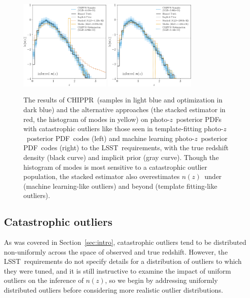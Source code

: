 \documentclass[iop]{emulateapj}
\newcommand{\Sect}[1]{Section~\ref{#1}}
\newcommand{\project}[1]{\textsc{#1}}
\newcommand{\lsst}{\project{LSST}}
\newcommand{\Chippr}{\project{CHIPPR}}
\newcommand{\pz}{photo-$z$}
\newcommand{\pzpdf}{\pz\ posterior PDF}
\newcommand{\nz}{$n(z)$}
\begin{document}
\begin{figure}
	\begin{center}
		\includegraphics[width=0.4\textwidth]{results_outlier_template.png}
		\includegraphics[width=0.4\textwidth]{results_outlier_training.png}
		\caption{
			The results of \Chippr\ (samples in light blue and optimization in dark blue) and the alternative approaches (the stacked estimator in red, the histogram of modes in yellow) on \pzpdf s with catastrophic outliers like those seen in template-fitting \pzpdf\ codes (left) and machine learning \pzpdf\ codes (right) to the \lsst\ requirements, with the true redshift density (black curve) and implicit prior (gray curve).
			Though the histogram of modes is most sensitive to a catastrophic outlier population, the stacked estimator also overestimates \nz\ under (machine learning-like outliers) and beyond (template fitting-like outliers).
		}
		\label{fig:nonuniform-outliers-results}
	\end{center}
\end{figure}

\subsection{Catastrophic outliers}
\label{sec:outliers}

As was covered in \Sect{sec:intro}, catastrophic outliers tend to be distributed non-uniformly across the space of observed and true redshift.
However, the \lsst\ requirements do not specify details for a distribution of outliers to which they were tuned, and it is still instructive to examine the impact of uniform outliers on the inference of \nz, so we begin by addressing uniformly distributed outliers before considering more realistic outlier distributions.
\end{document}

